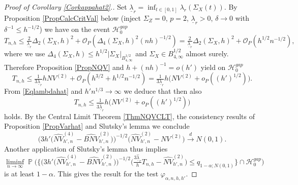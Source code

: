 \documentclass[preprint,aos]{imsart}
\numberwithin{equation}{section}
\theoremstyle{remark}
\DeclareMathOperator{\PP}{{\mathbb P}}
\renewcommand{\phi}{\varphi}
\providecommand{\abs}[1]{\lvert #1 \rvert}
\renewcommand{\le}{\leqslant}
\begin{document}
\begin{appendix}
\begin{proof}[Proof of Corollary \ref{Corkappahat2}.]
Set $\underline\lambda_r=\inf_{t\in[0,1]}\lambda_r(\Sigma_X(t))$.
By Proposition \ref{PropCalcCritVal} below (inject $\Sigma_Z=0$, $p=2$, $\underline\lambda_r>0$, $\delta\to 0$ with $\delta^{-1}\le h^{-1/2}$) we have on the event ${\mathcal H}_0^{gap}$
\[ T_{n,h}\le \tfrac{2}{\underline\lambda_r}\Delta_2(\Sigma_X,h)^2+{\mathcal O}_P(\Delta_4(\Sigma_X,h)^2(nh)^{-1/2})=\tfrac{2}{\underline\lambda_r}\Delta_2(\Sigma_X,h)^2+{\mathcal O}_P(h^{1/2}n^{-1/2}),\]
where we use $\Delta_4(\Sigma_X,h)\le h^{1/2}\abs{\Sigma_X}_{B^{1/2}_{4,\infty}}$ and $\Sigma_X\in B^{1/2}_{4,\infty}$ almost surely. Therefore Proposition \ref{PropNQV} and $h+(nh)^{-1}=o(h')$ yield on ${\mathcal H}_0^{gap}$
\[ T_{n,h}\le \tfrac{1}{3\underline\lambda_r}hNV^{(2)}+{\mathcal O}_P(h^{3/2}+h^{1/2}n^{-1/2})= \tfrac{1}{3\underline\lambda_r}h\big(NV^{(2)}+{ o}_P((h')^{1/2})\big).\]
From \eqref{Eqlambdahat} and $h'n^{1/3}\to\infty$ we deduce that then also
\[ T_{n,h}\le  \tfrac{1}{3\hat{\underline\lambda}_r}h\big(NV^{(2)}+{ o}_P((h')^{1/2})\big)\]
holds. By the Central Limit Theorem \ref{ThmNQVCLT}, the consistency results of Proposition \ref{PropVarhat} and Slutsky's lemma we conclude
\[ \Big(3h' \big(\widehat{NV}_{h',n}^{(4)}-\widehat{BNV}^{(2)}_{h',n}\big)\Big)^{-1/2}\Big(\widehat{NV}^{(2)}_{h',n}-NV^{(2)}\Big) \xrightarrow{d} N(0,1).
\]
Another application of Slutsky's lemma thus implies
\[ \liminf_{n\to\infty}\PP\Big(\Big\{\Big(3h' \big(\widehat{NV}_{h',n}^{(4)}-\widehat{BNV}^{(2)}_{h',n}\big)\Big)^{-1/2} \Big(\tfrac{3\hat{\underline\lambda}_r}{h}T_{n,h}-\widehat{NV}^{(2)}_{h',n}\Big)\le q_{1-\alpha;N(0,1)}\Big\}\cap{\mathcal H}_0^{gap}\Big)\]
is at least $1-\alpha$. This gives the result for the test $\phi_{\alpha,n,h,h'}$.
\end{proof}

\end{appendix}



\end{document}
